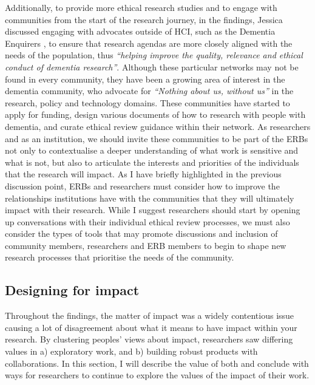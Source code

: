 Additionally, to provide more ethical research studies and to engage with communities from the start of the research journey, in the findings, Jessica discussed engaging with advocates outside of HCI, such as the Dementia Enquirers \cite{davies2021dementia}, to ensure that research agendas are more closely aligned with the needs of the population, thus \textit{``helping improve the quality, relevance and ethical conduct of dementia research''}. Although these particular networks may not be found in every community, they have been a growing area of interest in the dementia community, who advocate for \textit{``Nothing about us, without us''} \citep{spiel_nothing_2020} in the research, policy and technology domains. These communities have started to apply for funding, design various documents of how to research with people with dementia, and curate ethical review guidance within their network. As researchers and as an institution, we should invite these communities to be part of the ERBs not only to contextualise a deeper understanding of what work is sensitive and what is not, but also to articulate the interests and priorities of the individuals that the research will impact. As I have briefly highlighted in the previous discussion point, ERBs and researchers must consider how to improve the relationships institutions have with the communities that they will ultimately impact with their research. While I suggest researchers should start by opening up conversations with their individual ethical review processes, we must also consider the types of tools that may promote discussions and inclusion of community members, researchers and ERB members to begin to shape new research processes that prioritise the needs of the community. 

\subsection{Designing for impact}
\label{Discussion:Impact}
Throughout the findings, the matter of impact was a widely contentious issue causing a lot of disagreement about what it means to have impact within your research. By clustering peoples' views about impact, researchers saw differing values in a) exploratory work, and b) building robust products with collaborations. In this section, I will describe the value of both and conclude with ways for researchers to continue to explore the values of the impact of their work. 

